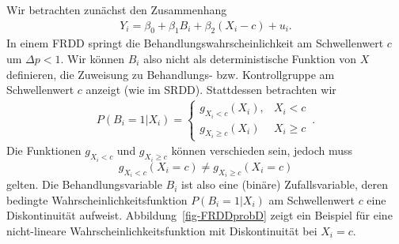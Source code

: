 \documentclass[
  a4paper,
  DIV=11,
  oneside]{scrreprt}
\begin{document}
Wir betrachten zunächst den Zusammenhang \begin{align}
  Y_i = \beta_0 + \beta_1 B_i + \beta_2 (X_i - c) + u_i.\label{eq-simpleFRDD}
\end{align} In einem FRDD springt die Behandlungswahrscheinlichkeit am
Schwellenwert \(c\) um \(\Delta p<1\). Wir können \(B_i\) also nicht als
deterministische Funktion von \(X\) definieren, die Zuweisung zu
Behandlungs- bzw. Kontrollgruppe am Schwellenwert \(c\) anzeigt (wie im
SRDD). Stattdessen betrachten wir \begin{align}
  P(B_i=1\vert X_i) = 
  \begin{cases}
    g_{X_i<c}(X_i), & X_i < c \\ 
    g_{X_i\geq c}(X_i) & X_i \geq c
  \end{cases}\,. \label{eq-BFRDD}
\end{align} Die Funktionen \(g_{X_i<c}\) und \(g_{X_i\geq c}\) können
verschieden sein, jedoch muss
\[g_{X_i<c}(X_i = c) \neq g_{X_i\geq c}(X_i = c)\] gelten. Die
Behandlungsvariable \(B_i\) ist also eine (binäre) Zufallsvariable,
deren bedingte Wahrscheinlichkeitsfunktion \(P(B_i=1\vert X_i)\) am
Schwellenwert \(c\) eine Diskontinuität aufweist.
Abbildung~\ref{fig-FRDDprobD} zeigt ein Beispiel für eine nicht-lineare
Wahrscheinlichkeitsfunktion mit Diskontinuität bei \(X_i = c\).
\end{document}
